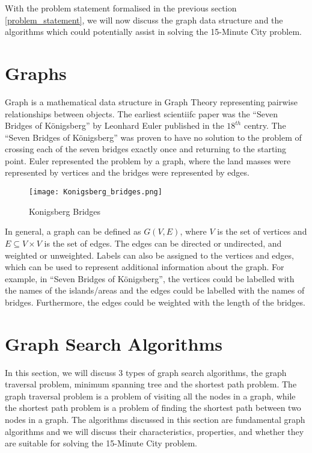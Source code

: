 With the problem statement formalised in the previous section \ref{problem_statement}, we will now discuss the graph data structure and the algorithms which could potentially assist in solving the 15-Minute City problem.

\section{Graphs}

Graph is a mathematical data structure in Graph Theory representing pairwise relationships between objects. The earliest scientiifc paper was the ``Seven Bridges of Königsberg'' by Leonhard Euler published in the $18^{th}$ centry. The ``Seven Bridges of Königsberg'' was proven to have no solution to the problem of crossing each of the seven bridges exactly once and returning to the starting point. Euler represented the problem by a graph, where the land masses were represented by vertices and the bridges were represented by edges.

\begin{figure}[H]
    \centering
    \texttt{[image: Konigsberg\_bridges.png]}
    \caption{Konigsberg Bridges}
    \label{fig:konigsberg_bridges}
\end{figure}\hfill

In general, a graph can be defined as $G(V,E)$, where $V$ is the set of vertices and $E\subseteq V\times V$ is the set of edges. The edges can be directed or undirected, and weighted or unweighted. Labels can also be assigned to the vertices and edges, which can be used to represent additional information about the graph. For example, in ``Seven Bridges of Königsberg'', the vertices could be labelled with the names of the islands/areas and the edges could be labelled with the names of bridges. Furthermore, the edges could be weighted with the length of the bridges.

\section{Graph Search Algorithms}

In this section, we will discuss 3 types of graph search algorithms, the graph traversal problem, minimum spanning tree and the shortest path problem. The graph traversal problem is a problem of visiting all the nodes in a graph, while the shortest path problem is a problem of finding the shortest path between two nodes in a graph. The algorithms discussed in this section are fundamental graph algorithms and we will discuss their characteristics, properties, and whether they are suitable for solving the 15-Minute City problem.


